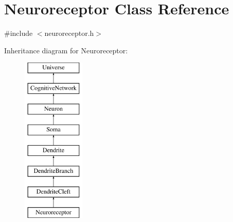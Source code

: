 \hypertarget{classNeuroreceptor}{}\section{Neuroreceptor Class Reference}
\label{classNeuroreceptor}


{\ttfamily \#include $<$neuroreceptor.\+h$>$}

Inheritance diagram for Neuroreceptor\+:\begin{figure}[H]
\begin{center}
\leavevmode
\includegraphics[height=8.000000cm]{classNeuroreceptor}
\end{center}
\end{figure}
